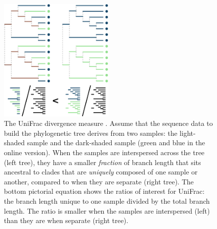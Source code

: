 \documentclass{amsart}
\newcommand{\forarxiv}[1]{#1}
\begin{document}
\newcommand{\unifracLegend}{
    The UniFrac divergence measure \citep[figure adapted from][]{LozuponeKnightUniFrac05}.
    Assume that the sequence data to build the phylogenetic tree derives from two samples: the light-shaded sample and the dark-shaded sample (green and blue in the online version).
    When the samples are interspersed across the tree (left tree), they have a smaller \textit{fraction} of branch length that sits ancestral to clades that are \textit{uniquely} composed of one sample or another, compared to when they are separate (right tree).
    The bottom pictorial equation shows the ratios of interest for UniFrac: the branch length unique to one sample divided by the total branch length.
    The ratio is smaller when the samples are interspersed (left) than they are when separate (right tree).
}
\forarxiv{
\begin{figure}
  \vspace{-4pt}
  \begin{center}
    \includegraphics[width=2.2in]{figures/unifrac.pdf}
  \end{center}
  \vspace{-10pt}
  \caption{\unifracLegend}
  \label{fig:unifrac}
\end{figure}
}
\end{document}
